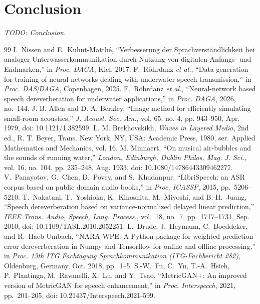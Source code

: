 \documentclass[conference]{IEEEtran}
\begin{document}
\section{Conclusion}
\textit{TODO: Conclusion.}

\begin{thebibliography}{99}
 I.~Nissen and E.~Kuhnt-Matth\'e, ``Verbesserung der Sprachverst\"andlichkeit bei
analoger Unterwasserkommunikation durch Nutzung von digitalen Anfangs- und Endmarken,'' in
\emph{Proc. DAGA}, Kiel, 2017.
 F.~R\"ohrdanz \emph{et al.}, ``Data generation for training of neural networks
dealing with underwater speech transmission,'' in \emph{Proc. DAS|DAGA}, Copenhagen, 2025.
 F.~R\"ohrdanz \emph{et al.}, ``Neural-network based speech dereverberation for
underwater applications,'' in \emph{Proc. DAGA}, 2026, no.~144.
 J. B. Allen and D. A. Berkley, ``Image method for efficiently simulating small-room acoustics,'' \emph{J. Acoust. Soc. Am.}, vol. 65, no. 4, pp. 943--950, Apr. 1979, doi: 10.1121/1.382599.
 L. M. Brekhovskikh, \emph{Waves in Layered Media}, 2nd ed., R. T. Beyer, Trans. New York, NY, USA: Academic Press, 1980, ser. Applied Mathematics and Mechanics, vol. 16.
 M. Minnaert, ``On musical air-bubbles and the sounds of running water,'' \emph{London, Edinburgh, Dublin Philos. Mag. J. Sci.}, vol. 16, no. 104, pp. 235--248, Aug. 1933, doi: 10.1080/14786443309462277.
 V.~Panayotov, G.~Chen, D.~Povey, and S.~Khudanpur, ``LibriSpeech: an ASR corpus
based on public domain audio books,'' in \emph{Proc. ICASSP}, 2015, pp.~5206--5210.
 T.~Nakatani, T.~Yoshioka, K.~Kinoshita, M.~Miyoshi, and B.-H.~Juang, ``Speech dereverberation based on variance-normalized delayed linear prediction,'' \emph{IEEE Trans. Audio, Speech, Lang. Process.}, vol.~18, no.~7, pp.~1717--1731, Sep. 2010, doi: 10.1109/TASL.2010.2052251.
 L.~Drude, J.~Heymann, C.~Boeddeker, and R.~Haeb-Umbach, ``NARA-WPE: A Python package for weighted prediction error dereverberation in Numpy and Tensorflow for online and offline processing,'' in \emph{Proc. 13th ITG Fachtagung Sprachkommunikation (ITG-Fachbericht 282)}, Oldenburg, Germany, Oct. 2018, pp.~1--5.
 S.-W.~Fu, C.~Yu, T.-A.~Hsieh, P.~Plantinga, M.~Ravanelli, X.~Lu, and Y.~Tsao, ``MetricGAN+: An improved version of MetricGAN for speech enhancement,'' in \emph{Proc. Interspeech}, 2021, pp.~201--205, doi: 10.21437/Interspeech.2021-599.

\end{thebibliography}
\end{document}
